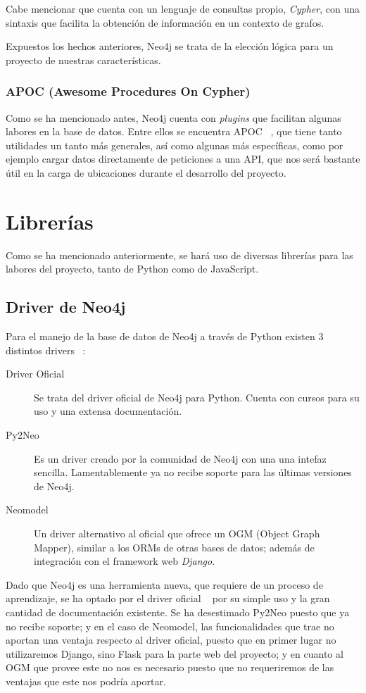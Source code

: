 Cabe mencionar 
que cuenta con un lenguaje de consultas propio, \textit{Cypher}, con una sintaxis que 
facilita la obtención de información en un contexto de grafos.

Expuestos los hechos anteriores, Neo4j se trata de la elección lógica para un proyecto de nuestras 
características.

\subsubsection{APOC (Awesome Procedures On Cypher)}
Como se ha mencionado antes, Neo4j cuenta con \textit{plugins} que facilitan algunas labores
en la base de datos. Entre ellos se encuentra APOC ~\cite{APOC}, que tiene tanto utilidades un tanto más generales,
así como algunas más específicas, como por ejemplo cargar datos directamente de peticiones a una API, que nos
será bastante útil en la carga de ubicaciones durante el desarrollo del proyecto.

\section{Librerías}
Como se ha mencionado anteriormente, se hará uso de diversas librerías para las labores del proyecto,
tanto de Python como de JavaScript.
\subsection{Driver de Neo4j}
Para el manejo de la base de datos de Neo4j a través de Python existen 3 distintos drivers ~\cite{neo4jpythonDrivers}:

\begin{description}
    \item [Driver Oficial] Se trata del driver oficial de Neo4j para Python. Cuenta con cursos para su uso y una extensa documentación.
    \item [Py2Neo] Es un driver creado por la comunidad de Neo4j con una una intefaz sencilla. Lamentablemente ya no recibe soporte para las últimas versiones de Neo4j.
    \item [Neomodel] Un driver alternativo al oficial que ofrece un OGM (Object Graph Mapper), similar a los ORMs de otras bases de datos; además de integración con el framework web \textit{Django}.
\end{description}

Dado que Neo4j es una herramienta nueva, que requiere de un proceso de aprendizaje, se ha optado
por el driver oficial ~\cite{neo4jdriver} por su simple uso y la gran cantidad de documentación existente. Se ha desestimado Py2Neo
puesto que ya no recibe soporte; y en el caso de Neomodel, las funcionalidades que trae no aportan una ventaja
respecto al driver oficial, puesto que en primer lugar no utilizaremos Django, sino Flask para la parte web del proyecto;
y en cuanto al OGM que provee este no nos es necesario puesto que no requeriremos de las ventajas que este nos podría aportar.

